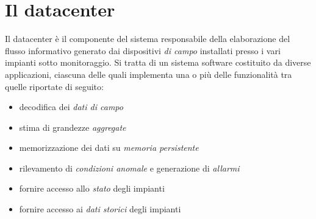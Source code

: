 \clearpage{\pagestyle{empty}\cleardoublepage}
\chapter{Il datacenter}\label{sec:datacenter}
Il datacenter \`e il componente del sistema responsabile della elaborazione 
del flusso informativo generato dai dispositivi \emph{di campo} installati 
presso i vari impianti sotto monitoraggio.
%
Si tratta di un sistema software costituito da diverse applicazioni, ciascuna 
delle quali implementa una o pi\`u delle funzionalit\`a tra quelle riportate di seguito:
%
\begin{itemize}
  \item decodifica dei \emph{dati di campo}
  \item stima di grandezze \emph{aggregate}
  \item memorizzazione dei dati su \emph{memoria persistente}
  \item rilevamento di \emph{condizioni anomale} e generazione di \emph{allarmi}
  \item fornire accesso allo \emph{stato} degli impianti
  \item fornire accesso ai \emph{dati storici} degli impianti
\end{itemize}
%

